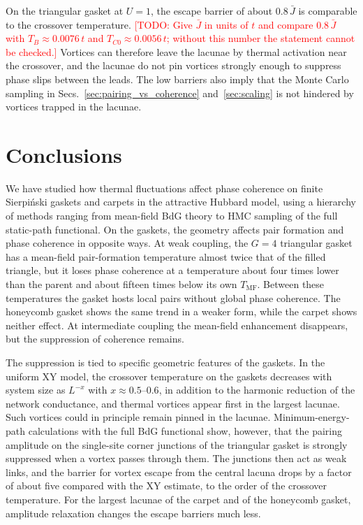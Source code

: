 \documentclass[aps,prb,twocolumn,superscriptaddress,floatfix]{revtex4-2}
\newcommand{\Tmf}{T_{\mathrm{MF}}}
\newcommand{\Jb}{\bar{J}}
\newcommand{\todo}[1]{\textcolor{red}{[TODO: #1]}}
\begin{document}
On the triangular gasket at $U = 1$, the escape barrier of about $0.8\,\Jb$ is
comparable to the crossover temperature.
\todo{Give $\Jb$ in units of $t$ and compare $0.8\,\Jb$ with
$T_B \approx 0.0076\,t$ and $T_{C0} \approx 0.0056\,t$; without this number the
statement cannot be checked.}
Vortices can therefore leave the lacunae by thermal activation near the
crossover, and the lacunae do not pin vortices strongly enough to suppress
phase slips between the leads. The low barriers also imply that the Monte
Carlo sampling in Secs.~\ref{sec:pairing_vs_coherence}
and~\ref{sec:scaling} is not hindered by vortices trapped in the lacunae.

\section{Conclusions}
\label{sec:conclusions}

We have studied how thermal fluctuations affect phase coherence on finite
Sierpi\'nski gaskets and carpets in the attractive Hubbard model, using a
hierarchy of methods ranging from mean-field BdG theory to HMC sampling of the
full static-path functional. On the gaskets, the geometry affects pair
formation and phase coherence in opposite ways. At weak coupling, the $G=4$
triangular gasket has a mean-field pair-formation temperature almost twice
that of the filled triangle, but it loses phase coherence at a temperature
about four times lower than the parent and about fifteen times below its own
$\Tmf$. Between these temperatures the gasket hosts local pairs without global
phase coherence. The honeycomb gasket shows the same trend in a weaker form,
while the carpet shows neither effect. At intermediate coupling the mean-field
enhancement disappears, but the suppression of coherence remains.

The suppression is tied to specific geometric features of the gaskets. In the
uniform XY model, the crossover temperature on the gaskets decreases with
system size as $L^{-x}$ with $x \approx 0.5$--$0.6$, in addition to the
harmonic reduction of the network conductance, and thermal vortices appear
first in the largest lacunae. Such vortices could in principle remain pinned
in the lacunae. Minimum-energy-path calculations with the full BdG functional
show, however, that the pairing amplitude on the single-site corner junctions
of the triangular gasket is strongly suppressed when a vortex passes through
them. The junctions then act as weak links, and the barrier for vortex escape
from the central lacuna drops by a factor of about five compared with the XY
estimate, to the order of the crossover temperature. For the largest lacunae
of the carpet and of the honeycomb gasket, amplitude relaxation changes the
escape barriers much less.
\end{document}
